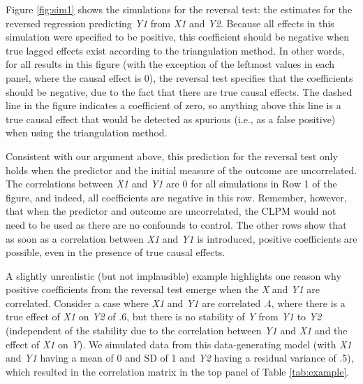 \documentclass[
  man,mask,floatsintext]{apa6}
\begin{document}
Figure \ref{fig:sim1} shows the simulations for the reversal test: the estimates for the reversed regression predicting \emph{Y1} from \emph{X1} and \emph{Y2}. Because all effects in this simulation were specified to be positive, this coefficient should be negative when true lagged effects exist according to the triangulation method. In other words, for all results in this figure (with the exception of the leftmost values in each panel, where the causal effect is 0), the reversal test specifies that the coefficients should be negative, due to the fact that there are true causal effects. The dashed line in the figure indicates a coefficient of zero, so anything above this line is a true causal effect that would be detected as spurious (i.e., as a false positive) when using the triangulation method.

Consistent with our argument above, this prediction for the reversal test only holds when the predictor and the initial measure of the outcome are uncorrelated. The correlations between \emph{X1} and \emph{Y1} are 0 for all simulations in Row 1 of the figure, and indeed, all coefficients are negative in this row. Remember, however, that when the predictor and outcome are uncorrelated, the CLPM would not need to be used as there are no confounds to control. The other rows show that as soon as a correlation between \emph{X1} and \emph{Y1} is introduced, positive coefficients are possible, even in the presence of true causal effects.

A slightly unrealistic (but not implausible) example highlights one reason why positive coefficients from the reversal test emerge when the \emph{X} and \emph{Y1} are correlated. Consider a case where \emph{X1} and \emph{Y1} are correlated .4, where there is a true effect of \emph{X1} on \emph{Y2} of .6, but there is no stability of \emph{Y} from \emph{Y1} to \emph{Y2} (independent of the stability due to the correlation between \emph{Y1} and \emph{X1} and the effect of \emph{X1} on \emph{Y}). We simulated data from this data-generating model (with \emph{X1} and \emph{Y1} having a mean of 0 and SD of 1 and \emph{Y2} having a residual variance of .5), which resulted in the correlation matrix in the top panel of Table \ref{tab:example}.
\end{document}
